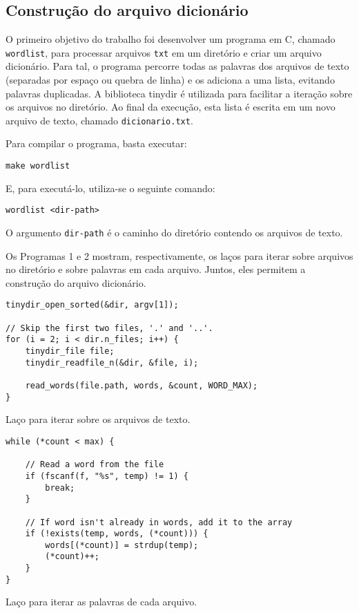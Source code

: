 \documentclass{sig-alternate-05-2015}
\begin{document}
\subsection{Construção do arquivo dicionário}
O primeiro objetivo do trabalho foi desenvolver um programa em C, chamado \texttt{wordlist}, para processar arquivos \texttt{txt} em um diretório e criar um arquivo dicionário.
Para tal, o programa percorre todas as palavras dos arquivos de texto (separadas por espaço ou quebra de linha) e os adiciona a uma lista, evitando palavras duplicadas. A biblioteca tinydir \cite{tinydir} é utilizada para facilitar a iteração sobre os arquivos no diretório. Ao final da execução, esta lista é escrita em um novo arquivo de texto, chamado \texttt{dicionario.txt}.

Para compilar o programa, basta executar:
\begin{verbatim}
make wordlist
\end{verbatim}

E, para executá-lo, utiliza-se o seguinte comando:
\begin{verbatim}
wordlist <dir-path>
\end{verbatim}

O argumento \texttt{dir-path} é o caminho do diretório contendo os arquivos de texto.

Os Programas 1 e 2 mostram, respectivamente, os laços para iterar sobre arquivos no diretório e sobre palavras em cada arquivo.
Juntos, eles permitem a construção do arquivo dicionário.

\begin{program}
\begin{lstlisting}
tinydir_open_sorted(&dir, argv[1]);

// Skip the first two files, '.' and '..'.
for (i = 2; i < dir.n_files; i++) {
    tinydir_file file;
    tinydir_readfile_n(&dir, &file, i);
    
    read_words(file.path, words, &count, WORD_MAX);
}
\end{lstlisting}
\caption{Laço para iterar sobre os arquivos de texto.}
\end{program}

\begin{program}
\begin{lstlisting}
while (*count < max) {

    // Read a word from the file
    if (fscanf(f, "%s", temp) != 1) {
        break;
    }

    // If word isn't already in words, add it to the array
    if (!exists(temp, words, (*count))) {
        words[(*count)] = strdup(temp);
        (*count)++;
    }
}
\end{lstlisting}
\caption{Laço para iterar as palavras de cada arquivo.}
\end{program}
\end{document}
